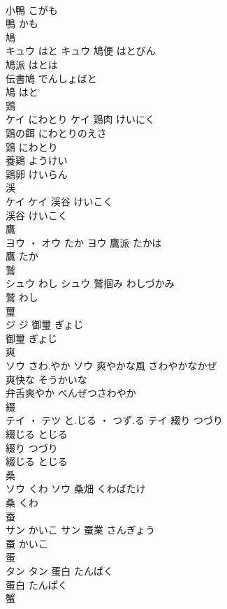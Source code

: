 \documentclass[8pt]{extreport}
\begin{document}
\begin{CJK}{UTF8}{min}
\\	小鴨	こがも	
\\	鴨	かも	
\\	鳩	
\\	キュウ	はと	キュウ	鳩便	はとびん	
\\	鳩派	はとは	
\\	伝書鳩	でんしょばと	
\\	鳩	はと	
\\	鶏	
\\	ケイ	にわとり	ケイ	鶏肉	けいにく	
\\	鶏の餌	にわとりのえさ	
\\	鶏	にわとり	
\\	養鶏	ようけい	
\\	鶏卵	けいらん	
\\	渓	
\\	ケイ		ケイ	渓谷	けいこく	
\\	渓谷	けいこく	
\\	鷹	
\\	ヨウ ・ オウ	たか	ヨウ	鷹派	たかは	
\\	鷹	たか	
\\	鷲	
\\	シュウ	わし	シュウ	鷲掴み	わしづかみ	
\\	鷲	わし	
\\	璽	
\\	ジ		ジ	御璽	ぎょじ	
\\	御璽	ぎょじ	
\\	爽	
\\	ソウ	さわ.やか	ソウ	爽やかな風	さわやかなかぜ	
\\	爽快な	そうかいな	
\\	弁舌爽やか	べんぜつさわやか	
\\	綴	
\\	テイ ・ テツ	と.じる ・ つず.る	テイ	綴り	つづり	
\\	綴じる	とじる	
\\	綴り	つづり	
\\	綴じる	とじる	
\\	桑	
\\	ソウ	くわ	ソウ	桑畑	くわばたけ	
\\	桑	くわ	
\\	蚕	
\\	サン	かいこ	サン	蚕業	さんぎょう	
\\	蚕	かいこ	
\\	蛋	
\\	タン		タン	蛋白	たんぱく	
\\	蛋白	たんぱく	
\\	蟹	

\end{CJK}
\end{document}

